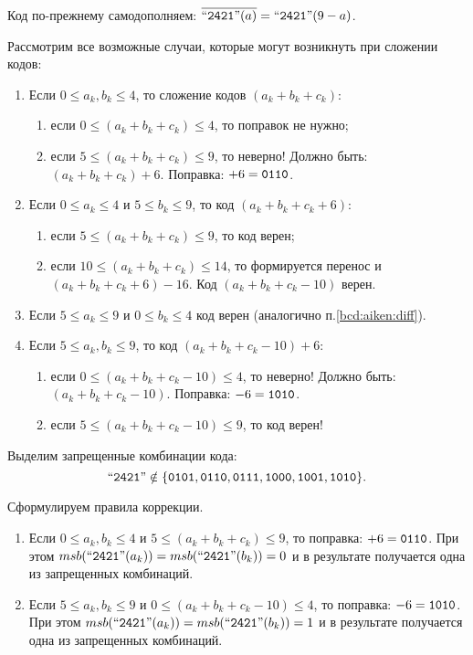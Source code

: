 Код по-прежнему самодополняем: $\overline{\text{``\texttt{2421}''}(a)} = \text{``\texttt{2421}''}(9-a)$.

Рассмотрим все возможные случаи, которые могут возникнуть при сложении кодов:
\begin{enumerate}
    \item Если $0\leq a_{k},b_{k}\leq 4$, то сложение кодов $(a_{k}+b_{k}+c_{k})$:
    \begin{enumerate}
        \item если $0\leq (a_{k}+b_{k}+c_{k}) \leq 4$, то поправок не нужно;
        \item если $5\leq(a_{k}+b_{k}+c_{k}) \leq 9$, то неверно! Должно быть: $(a_{k}+b_{k}+c_{k})+6$. Поправка: $+6=\texttt{0110}$.
    \end{enumerate}

    \item\label{bcd:aiken:diff} Если $0\leq a_{k}\leq 4$ и $5\leq b_{k}\leq 9$, то код $(a_{k}+b_{k}+c_{k}+6)$:
    \begin{enumerate}
        \item если $5\leq (a_{k}+b_{k}+c_{k}) \leq 9$, то код верен;
        \item если $10\leq(a_{k}+b_{k}+c_{k}) \leq 14$, то формируется перенос и $(a_{k}+b_{k}+c_{k}+6)-16$. Код $(a_{k}+b_{k}+c_{k}-10)$ верен.
    \end{enumerate}
    
    \item Если $5\leq a_{k}\leq 9$ и $0\leq b_{k}\leq 4$ код верен (аналогично п.\ref{bcd:aiken:diff}).

    \item Если $5\leq a_{k},b_{k}\leq 9$, то код $(a_{k}+b_{k}+c_{k}-10)+6$:
    \begin{enumerate}
        \item если $0\leq (a_{k}+b_{k}+c_{k}-10) \leq 4$, то неверно! Должно быть: $(a_{k}+b_{k}+c_{k} - 10)$. Поправка: $-6=\texttt{1010}$.
        \item если $5\leq(a_{k}+b_{k}+c_{k}-10) \leq 9$, то код верен!
    \end{enumerate}
\end{enumerate}

Выделим запрещенные комбинации кода:
\[
    \text{``\texttt{2421}''}\notin\{\texttt{0101},\texttt{0110},\texttt{0111},\texttt{1000},\texttt{1001},\texttt{1010}\}.
\]
    
Сформулируем правила коррекции.
\begin{enumerate}
    \item Если $0\leq a_{k},b_{k}\leq 4$ и $5\leq(a_{k}+b_{k}+c_{k})\leq 9$, то поправка: $+6=\texttt{0110}$. 
    При этом $msb(\text{``\texttt{2421}''}(a_k))=msb(\text{``\texttt{2421}''}(b_k))=0$ и в результате получается одна из запрещенных комбинаций.
    
    \item Если $5\leq a_{k},b_{k}\leq 9$ и $0\leq(a_{k}+b_{k}+c_{k}-10)\leq 4$, то поправка: $-6=\texttt{1010}$.
    При этом $msb(\text{``\texttt{2421}''}(a_k))=msb(\text{``\texttt{2421}''}(b_k))=1$ и в результате получается одна из запрещенных комбинаций.
\end{enumerate}

